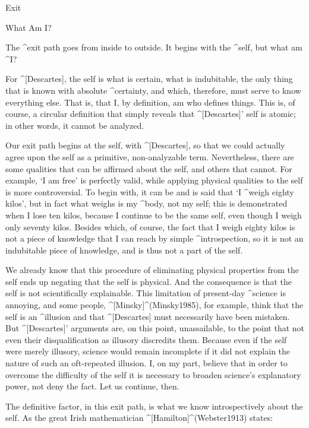 
\Part Exit

\Section What Am I?

The ^{exit path} goes from inside to outside. It begins with the
^{self}, but what am ^{I}?

For ^[Descartes], the self is what is certain, what is indubitable, the
only thing that is known with absolute ^{certainty}, and which,
therefore, must serve to know everything else. That is, that I, by
definition, am who defines things. This is, of course, a circular
definition that simply reveals that ^[Descartes]' self is atomic; in
other words, it cannot be analyzed.

Our exit path begins at the self, with ^[Descartes], so that we could
actually agree upon the self as a primitive, non-analyzable term.
Nevertheless, there are some qualities that can be affirmed about the
self, and others that cannot. For example, `I am free' is perfectly
valid, while applying physical qualities to the self is more
controversial. To begin with, it can be and is said that `I ^{weigh}
eighty kilos', but in fact what weighs is my ^{body}, not my self; this
is demonstrated when I lose ten kilos, because I continue to be the same
self, even though I weigh only seventy kilos. Besides which, of course,
the fact that I weigh eighty kilos is not a piece of knowledge that I
can reach by simple ^{introspection}, so it is not an indubitable piece
of knowledge, and is thus not a part of the self.

We already know that this procedure of eliminating physical properties
from the self ends up negating that the self is physical. And the
consequence is that the self is not scientifically explainable. This
limitation of present-day ^{science} is annoying, and some people,
^[Minsky]^(Minsky1985), for example, think that the self is an
^{illusion} and that ^[Descartes] must necessarily have been mistaken.
But ^[Descartes]' arguments are, on this point, unassailable, to the
point that not even their disqualification as illusory discredits them.
Because even if the self were merely illusory, science would remain
incomplete if it did not explain the nature of such an oft-repeated
illusion. I, on my part, believe that in order to overcome the
difficulty of the self it is necessary to broaden science's explanatory
power, not deny the fact. Let us continue, then.

The definitive factor, in this exit path, is what we know
introspectively about the self. As the great Irish mathematician
^[Hamilton]^(Webster1913) states:

